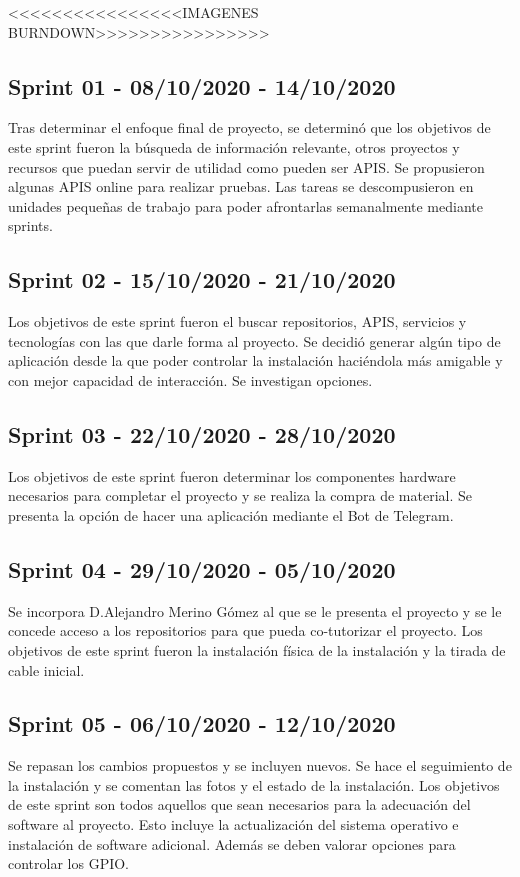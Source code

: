 <<<<<<<<<<<<<<<<IMAGENES BURNDOWN>>>>>>>>>>>>>>>>

\subsection{Sprint 01 - 08/10/2020 - 14/10/2020}
Tras determinar el enfoque final de proyecto, se determinó que los objetivos de este sprint fueron la búsqueda de información relevante, otros proyectos y recursos que puedan servir de utilidad como pueden ser APIS. Se propusieron algunas APIS online para realizar pruebas.
Las tareas se descompusieron en unidades pequeñas de trabajo para poder afrontarlas semanalmente mediante sprints.

\subsection{Sprint 02 - 15/10/2020 - 21/10/2020}
Los objetivos de este sprint fueron el buscar repositorios, APIS, servicios y tecnologías con las que darle forma al proyecto. Se decidió generar algún tipo de aplicación desde la que poder controlar la instalación haciéndola más amigable y con mejor capacidad de interacción. Se investigan opciones.

\subsection{Sprint 03 - 22/10/2020 - 28/10/2020}
Los objetivos de este sprint fueron determinar los componentes hardware necesarios para completar el proyecto y se realiza la compra de material.
Se presenta la opción de hacer una aplicación mediante el Bot de Telegram.

\subsection{Sprint 04 - 29/10/2020 - 05/10/2020}
Se incorpora D.Alejandro Merino Gómez al que se le presenta el proyecto y se le concede acceso a los repositorios para que pueda co-tutorizar el proyecto.
Los objetivos de este sprint fueron la instalación física de la instalación y la tirada de cable inicial.

\subsection{Sprint 05 - 06/10/2020 - 12/10/2020}
Se repasan los cambios propuestos y se incluyen nuevos. Se hace el seguimiento de la instalación y se comentan las fotos y el estado de la instalación.
Los objetivos de este sprint son todos aquellos que sean necesarios para la adecuación del software al proyecto. Esto incluye la actualización del sistema operativo e instalación de software adicional. Además se deben valorar opciones para controlar los GPIO.






